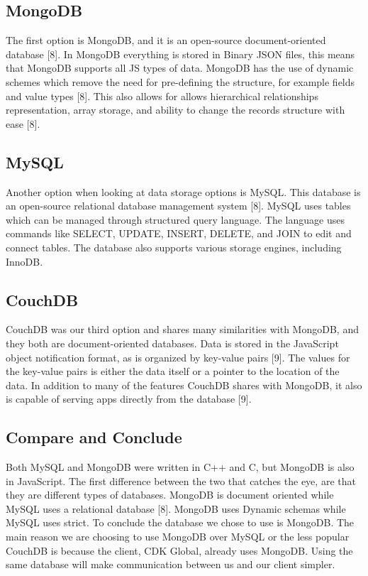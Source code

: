 \documentclass[onecolumn, draftclsnofoot,10pt, compsoc]{IEEEtran}
\begin{document}
	\subsection{MongoDB}
	
		The first option is MongoDB, and it is an open-source document-oriented database [8]. In MongoDB everything is stored in Binary JSON files, this means that MongoDB supports all JS types of data. MongoDB has the use of dynamic schemes which remove the need for
		pre-defining the structure, for example fields and value types [8]. This also allows for allows hierarchical relationships representation, array storage, and ability to change the records structure with ease [8].
		
	\subsection{MySQL}	
	
		Another option when looking at data storage options is MySQL. This database is an open-source relational database management system [8]. MySQL uses tables which can be managed through structured query language. The language uses commands like SELECT, UPDATE, INSERT, DELETE,
		and JOIN to edit and connect tables. The database also supports various storage engines, including InnoDB. 
		
	\subsection{CouchDB}
	
		CouchDB was our third option and shares many similarities with MongoDB, and they both are document-oriented databases. Data is stored in the JavaScript object notification format, as is organized by key-value pairs [9]. The values for the key-value pairs is either the data 
		itself or a pointer to the location of the data. In addition to many of the features CouchDB shares with MongoDB, it also is capable of serving apps directly from the database [9].
	
	\subsection{Compare and Conclude}
	
		Both MySQL and MongoDB were written in C++ and C, but MongoDB is also in JavaScript. The first difference between the two that catches the eye, are that they are different types of databases. MongoDB is document oriented while MySQL uses a relational database [8]. MongoDB uses 
		Dynamic schemas while MySQL uses strict. To conclude the database we chose to use is MongoDB. The main reason we are choosing to use MongoDB over MySQL or the less popular CouchDB is because the client, CDK Global, already uses MongoDB. Using the same database will make communication
		between us and our client simpler.
		
\end{document}
